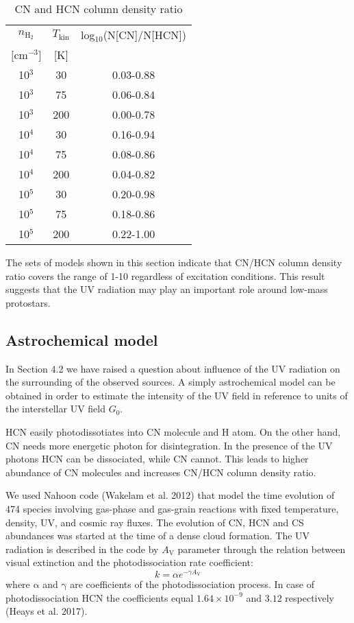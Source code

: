 \documentclass{aa}
\begin{document}
\begin{table}
\caption{CN and HCN column density ratio}             %
\label{table:5}      %
\centering                          %
\begin{tabular}{c c c} 
\hline\hline  
$n_\mathrm{H_2}$ & $T_\mathrm{kin}$ & log$_{10}$(N[CN]/N[HCN]) \\
$[$cm$^{-3}]$ & [K] & \\
\hline
10$^{3}$ & 30 & 0.03-0.88\\
10$^{3}$ & 75 & 0.06-0.84\\
10$^{3}$ & 200 & 0.00-0.78\\ 
10$^{4}$ & 30 & 0.16-0.94\\
10$^{4}$ & 75 & 0.08-0.86\\
10$^{4}$ & 200 & 0.04-0.82\\ 
10$^{5}$ & 30 & 0.20-0.98\\
10$^{5}$ & 75 & 0.18-0.86\\
10$^{5}$ & 200 & 0.22-1.00\\ \hline
\end{tabular}
\end{table} 

The sets of models shown in this section indicate that CN/HCN column density ratio covers the range of 1-10 regardless of excitation conditions. This result suggests that the UV radiation may play an important role around low-mass protostars. 

\subsection{Astrochemical model}
In Section 4.2 we have raised a question about influence of the UV radiation on the surrounding of the observed sources. A simply astrochemical model can be obtained in order to estimate the intensity of the UV field in reference to units of the interstellar UV field $G_0$.

HCN easily photodissotiates into CN molecule and H atom. On the other hand, CN needs more energetic photon for disintegration. In the presence of the UV photons HCN can be dissociated, while CN cannot. This leads to higher abundance of CN molecules and increases CN/HCN column density ratio.

We used Nahoon code (Wakelam et al. 2012) that model the time evolution of 474 species involving gas-phase and gas-grain reactions with fixed temperature, density, UV, and cosmic ray fluxes. The evolution of CN, HCN and CS abundances was started at the time of a dense cloud formation. The UV radiation is described in the code by $A_\mathrm{V}$ parameter through the relation between visual extinction and the photodissociation rate coefficient:
\begin{equation} \label{eq1}
k =  \alpha e^{-\gamma A_\mathrm{V}}
\end{equation}
where $\mathrm{\alpha}$ and $\mathrm{\gamma}$ are coefficients of the photodissociation process. In case of photodissociation HCN the coefficients equal $1.64\times10^{-9}$ and $3.12$ respectively (Heays et al. 2017). 
\end{document}
